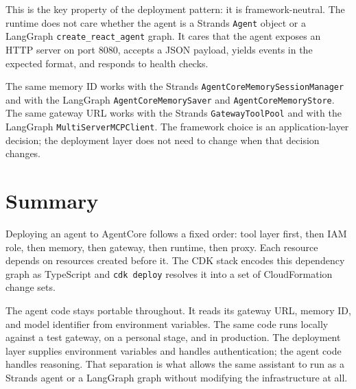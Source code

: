This is the key property of the deployment pattern: it is framework-neutral. The runtime
does not care whether the agent is a Strands \texttt{Agent} object or a LangGraph
\texttt{create\_react\_agent} graph. It cares that the agent exposes an HTTP server on
port 8080, accepts a JSON payload, yields events in the expected format, and responds to
health checks.

The same memory ID works with the Strands \texttt{AgentCoreMemorySessionManager} and
with the LangGraph \texttt{AgentCoreMemorySaver} and \texttt{AgentCoreMemoryStore}. The
same gateway URL works with the Strands \texttt{GatewayToolPool} and with the LangGraph
\texttt{MultiServerMCPClient}. The framework choice is an application-layer decision; the
deployment layer does not need to change when that decision changes.

\section{Summary}

Deploying an agent to AgentCore follows a fixed order: tool layer first, then IAM role,
then memory, then gateway, then runtime, then proxy. Each resource depends on resources
created before it. The CDK stack encodes this dependency graph as TypeScript and
\texttt{cdk deploy} resolves it into a set of CloudFormation change sets.

The agent code stays portable throughout. It reads its gateway URL, memory ID, and model
identifier from environment variables. The same code runs locally against a test gateway,
on a personal stage, and in production. The deployment layer supplies environment
variables and handles authentication; the agent code handles reasoning. That separation
is what allows the same assistant to run as a Strands agent or a LangGraph graph without
modifying the infrastructure at all.
